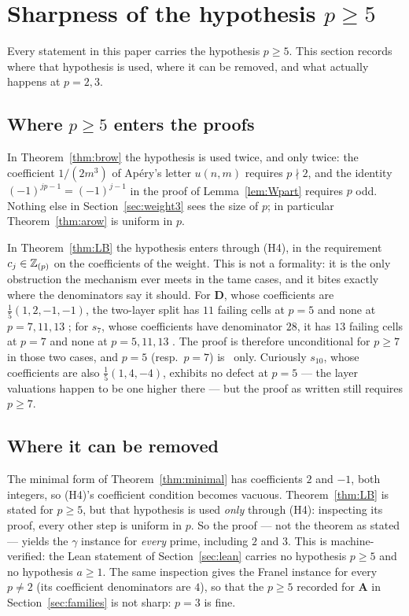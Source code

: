 \section{Sharpness of the hypothesis \texorpdfstring{$p\ge5$}{p >= 5}}
\label{sec:sharpness}

Every statement in this paper carries the hypothesis $p\ge5$. This section records where
that hypothesis is used, where it can be removed, and what actually happens at $p=2,3$.

\subsection{Where \texorpdfstring{$p\ge5$}{p >= 5} enters the proofs}

In Theorem~\ref{thm:brow} the hypothesis is used twice, and only twice: the coefficient
$1/(2m^3)$ of Ap\'ery's letter $u(n,m)$ requires $p\nmid2$, and the identity
$(-1)^{jp-1}=(-1)^{j-1}$ in the proof of Lemma~\ref{lem:Wpart} requires $p$ odd. Nothing
else in Section~\ref{sec:weight3} sees the size of $p$; in particular
Theorem~\ref{thm:arow} is uniform in $p$.

In Theorem~\ref{thm:LB} the hypothesis enters through (H4), in the requirement
$c_j\in\mathbb{Z}_{(p)}$ on the coefficients of the weight. This is not a formality: it is the only
obstruction the mechanism ever meets in the tame cases, and it bites exactly where the
denominators say it should. For $\mathbf D$, whose coefficients are $\frac15(1,2,-1,-1)$,
the two-layer split has $11$ failing cells at $p=5$ and none at $p=7,11,13$ \Verified;
for $s_7$, whose coefficients have denominator $28$, it has $13$ failing cells at $p=7$
and none at $p=5,11,13$ \Verified. The proof is therefore unconditional for $p\ge7$ in
those two cases, and $p=5$ (resp.\ $p=7$) is \Verified\ only. Curiously $s_{10}$, whose
coefficients are also $\frac15(1,4,-4)$, exhibits no defect at $p=5$ --- the layer
valuations happen to be one higher there --- but the proof as written still requires
$p\ge7$.

\subsection{Where it can be removed}

The minimal form of Theorem~\ref{thm:minimal} has coefficients $2$ and $-1$, both
integers, so (H4)'s coefficient condition becomes vacuous. Theorem~\ref{thm:LB} is stated for
$p\ge5$, but that hypothesis is used \emph{only} through (H4): inspecting its proof, every
other step is uniform in $p$. So the proof --- not the theorem as stated --- yields the
$\gamma$ instance for \emph{every} prime, including $2$ and $3$. This is
machine-verified: the Lean statement of Section~\ref{sec:lean} carries no hypothesis
$p\ge5$ and no hypothesis $a\ge1$. The same inspection gives the Franel instance for every
$p\ne2$ (its coefficient denominators are $4$), so that the $p\ge5$ recorded for
$\mathbf A$ in Section~\ref{sec:families} is not sharp: $p=3$ is fine.

